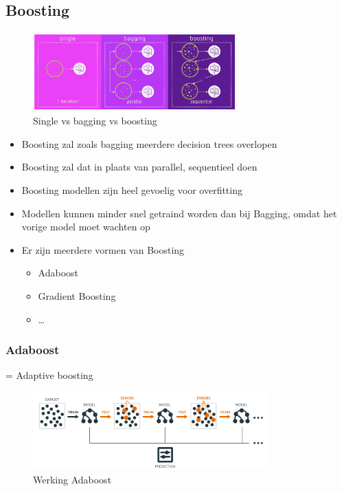 \documentclass{article}
\begin{document}
\subsection{Boosting}

\begin{figure}[H]
    \centering
    \includegraphics[width=0.7\textwidth]{boosting-principe.png}
    \caption{Single vs bagging vs boosting}
\end{figure}

\begin{itemize}
    \item Boosting zal zoals bagging meerdere decision trees overlopen
    \item Boosting zal dat in plaats van parallel, sequentieel doen
    \item Boosting modellen zijn heel gevoelig voor overfitting
    \item Modellen kunnen minder snel getraind worden dan bij Bagging, omdat het vorige model moet wachten op 
    \item Er zijn meerdere vormen van Boosting
    \begin{itemize}
        \item Adaboost
        \item Gradient Boosting
        \item \dots
    \end{itemize}
\end{itemize}

\subsubsection{Adaboost}

= Adaptive boosting

\begin{figure}[H]
    \centering
    \includegraphics[width=0.8\textwidth]{adaboost.png}
    \caption{Werking Adaboost}
\end{figure}
\end{document}

